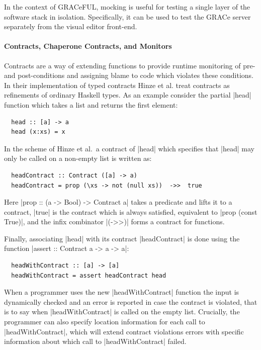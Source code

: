 \documentclass{article}
\begin{document}
In the context of GRACeFUL, mocking is useful for testing a single
layer of the software stack in isolation.
%
Specifically, it can be used to test the GRACe server separately from
the visual editor front-end.

\paragraph{Contracts, Chaperone Contracts, and Monitors}
%
Contracts \cite{Contracts} are a way of extending functions to provide runtime
monitoring of pre- and post-conditions and assigning blame to code which
violates these conditions.
%
In their implementation of typed contracts Hinze et al. \cite{ContractsHinze}
treat contracts as refinements of ordinary Haskell types.
%
As an example consider the partial |head| function which takes a list and
returns the first element:
%
\begin{verbatim}
  head :: [a] -> a
  head (x:xs) = x
\end{verbatim}
%
In the scheme of Hinze et al.\ a contract of |head| which specifies that |head|
may only be called on a non-empty list is written as:
%
\begin{verbatim}
  headContract :: Contract ([a] -> a)
  headContract = prop (\xs -> not (null xs))  ->>  true
\end{verbatim}
%
Here |prop :: (a -> Bool) -> Contract a| takes a predicate and lifts
it to a contract, |true| is the contract which is always satisfied,
equivalent to |prop (const True)|, and the infix combinator |(->>)|
forms a contract for functions.

%
Finally, associating |head| with its contract |headContract| is done
using the function |assert :: Contract a -> a -> a|:
%
\begin{verbatim}
  headWithContract :: [a] -> [a]
  headWithContract = assert headContract head
\end{verbatim}
%
When a programmer uses the new |headWithContract| function the input is
dynamically checked and an error is reported in case the contract is violated,
that is to say when |headWithContract| is called on the empty list.
%
Crucially, the programmer can also specify location information for each call to
|headWithContract|, which will extend contract violations errors with specific
information about which call to |headWithContract| failed.
\end{document}
